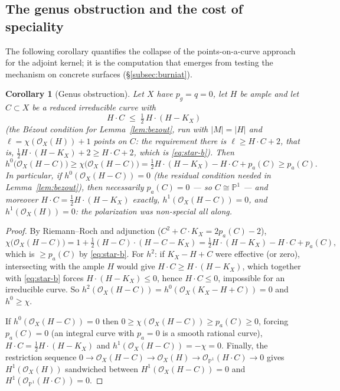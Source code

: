\documentclass[10pt,a4paper]{amsart}
\newtheorem{corollary}[theorem]{Corollary}
\newcommand{\OO}{\mathcal{O}}
\newcommand{\PP}{\mathbb{P}}
\newcommand{\len}{\ell}
\begin{document}
\subsection{The genus obstruction and the cost of speciality}\label{subsec:cost}
The following corollary quantifies the collapse of the points-on-a-curve approach for the adjoint kernel; it is the computation that emerges from testing the mechanism on concrete surfaces (\S\ref{subsec:burniat}).

\begin{corollary}[Genus obstruction]\label{cor:genus}
Let $X$ have $p_g=q=0$, let $H$ be ample and let $C\subset X$ be a reduced irreducible curve with
\begin{equation}\label{eq:star-b}
H\cdot C\;\le\;\tfrac12\,H\cdot(H-K_X)
\end{equation}
\textup{(}the B\'ezout condition for Lemma~\ref{lem:bezout}, run with $|M|=|H|$ and $\len=\chi(\OO_X(H))+1$ points on $C$: the requirement there is $\len\ge H\cdot C+2$, that is, $\tfrac12H\cdot(H-K_X)+2\ge H\cdot C+2$, which is \eqref{eq:star-b}\textup{)}. Then
\[
h^0\bigl(\OO_X(H-C)\bigr)\ge\chi\bigl(\OO_X(H-C)\bigr)=\tfrac12H\cdot(H-K_X)-H\cdot C+p_a(C)\ge p_a(C).
\]
In particular, if $h^0(\OO_X(H-C))=0$ \textup{(}the residual condition needed in Lemma~\ref{lem:bezout}\textup{)}, then necessarily $p_a(C)=0$ --- so $C\cong\PP^1$ --- and moreover $H\cdot C=\tfrac12H\cdot(H-K_X)$ exactly, $h^1(\OO_X(H-C))=0$, and $h^1(\OO_X(H))=0$: the polarization was non-special all along.
\end{corollary}

\begin{proof}
By Riemann--Roch and adjunction ($C^2+C\cdot K_X=2p_a(C)-2$),
\[
\chi\bigl(\OO_X(H-C)\bigr)=1+\tfrac12(H-C)\cdot(H-C-K_X)=\tfrac12H\cdot(H-K_X)-H\cdot C+p_a(C),
\]
which is $\ge p_a(C)$ by \eqref{eq:star-b}. For $h^2$: if $K_X-H+C$ were effective (or zero), intersecting with the ample $H$ would give $H\cdot C\ge H\cdot(H-K_X)$, which together with \eqref{eq:star-b} forces $H\cdot(H-K_X)\le0$, hence $H\cdot C\le 0$, impossible for an irreducible curve. So $h^2(\OO_X(H-C))=h^0(\OO_X(K_X-H+C))=0$ and $h^0\ge\chi$.

If $h^0(\OO_X(H-C))=0$ then $0\ge\chi(\OO_X(H-C))\ge p_a(C)\ge0$, forcing $p_a(C)=0$ (an integral curve with $p_a=0$ is a smooth rational curve), $H\cdot C=\tfrac12H\cdot(H-K_X)$ and $h^1(\OO_X(H-C))=-\chi=0$. Finally, the restriction sequence
$0\to\OO_X(H-C)\to\OO_X(H)\to\OO_{\PP^1}(H\cdot C)\to0$
gives $H^1(\OO_X(H))$ sandwiched between $H^1(\OO_X(H-C))=0$ and $H^1(\OO_{\PP^1}(H\cdot C))=0$.
\end{proof}
\end{document}
